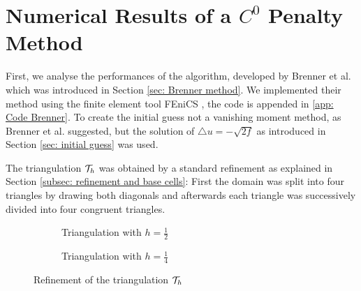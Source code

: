 
\section{Numerical Results of a $C^0$ Penalty Method}\label{sec: numerical results brenner}



First, we analyse the performances of the algorithm, developed by Brenner et al. \cite{BGN+2011} which was introduced in Section \ref{sec: Brenner method}.
We implemented their method using the finite element tool FEniCS \cite{FEniCS}, the code is appended in \ref{app: Code Brenner}. 
To create the initial guess not a vanishing moment method, as Brenner et al. suggested, but the solution of $\triangle u = -\sqrt{2f}$ as introduced in Section \ref{sec: initial guess} was used. 

The triangulation $\mathcal{T}_h$ was obtained by a standard refinement as explained in Section \ref{subsec: refinement and base cells}: First the domain was split into four triangles by drawing both diagonals and afterwards each triangle was successively divided into four congruent triangles.
\begin{figure}[H]
	\centering
	\begin{subfigure}{0.45\textwidth}
		\centering
		\edef \n {2}
		
		\caption{Triangulation with $h=\frac 1 2$}
		\label{fig: grid1}
	\end{subfigure}
	\begin{subfigure}{0.45\textwidth}
		\centering
		\edef \n {4}
		
		\caption{Triangulation with $h=\frac 1 4$}
		\label{fig: grid}
	\end{subfigure}	
	\caption{Refinement of the triangulation $\mathcal{T}_h$}
	\label{fig: grids}
\end{figure}

